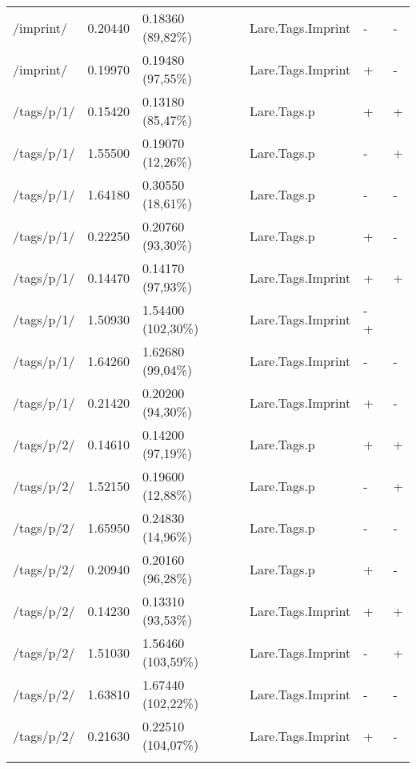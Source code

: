 \begin{appendix}
\begin{center}
\begin{longtable}{llllll}
	/imprint/ & 0.20440 & 0.18360 (89,82\%) & Lare.Tags.Imprint & - & - \\
	/imprint/ & 0.19970 & 0.19480 (97,55\%) & Lare.Tags.Imprint & + & - \\
	\hline
	\hline
	/tags/p/1/ & 0.15420 & 0.13180 (85,47\%) & Lare.Tags.p & + & + \\
	/tags/p/1/ & 1.55500 & 0.19070 (12,26\%) & Lare.Tags.p & - & + \\
	/tags/p/1/ & 1.64180 & 0.30550 (18,61\%) & Lare.Tags.p & - & - \\
	/tags/p/1/ & 0.22250 & 0.20760 (93,30\%) & Lare.Tags.p & + & - \\
	\hline
	/tags/p/1/ & 0.14470 & 0.14170 (97,93\%) & Lare.Tags.Imprint & + & + \\
	/tags/p/1/ & 1.50930 & 1.54400 (102,30\%) & Lare.Tags.Imprint & - + & \\
	/tags/p/1/ & 1.64260 & 1.62680 (99,04\%) & Lare.Tags.Imprint & - & - \\
	/tags/p/1/ & 0.21420 & 0.20200 (94,30\%) & Lare.Tags.Imprint & + & - \\
	\hline
	\hline
	/tags/p/2/ & 0.14610 & 0.14200 (97,19\%) & Lare.Tags.p & + & + \\
	/tags/p/2/ & 1.52150 & 0.19600 (12,88\%) & Lare.Tags.p & - & + \\
	/tags/p/2/ & 1.65950 & 0.24830 (14,96\%) & Lare.Tags.p & - & - \\
	/tags/p/2/ & 0.20940 & 0.20160 (96,28\%) & Lare.Tags.p & + & - \\
	\hline
	/tags/p/2/ & 0.14230 & 0.13310 (93,53\%) & Lare.Tags.Imprint & + & + \\
	/tags/p/2/ & 1.51030 & 1.56460 (103,59\%) & Lare.Tags.Imprint & - & + \\
	/tags/p/2/ & 1.63810 & 1.67440 (102,22\%) & Lare.Tags.Imprint & - & - \\
	/tags/p/2/ & 0.21630 & 0.22510 (104,07\%) & Lare.Tags.Imprint & + & - \\
	\hline
\label{tab:curl_results_external}
\end{longtable}
\end{center}

\newpage{}


\end{appendix}
